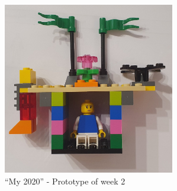 \begin{figure}[h]
    \begin{center}
        \includegraphics[width=7.5cm]{img/week_2.jpg}
    \end{center}
    \caption{``My 2020'' - Prototype of week 2}
    \label{fig:week2}
\end{figure} 
